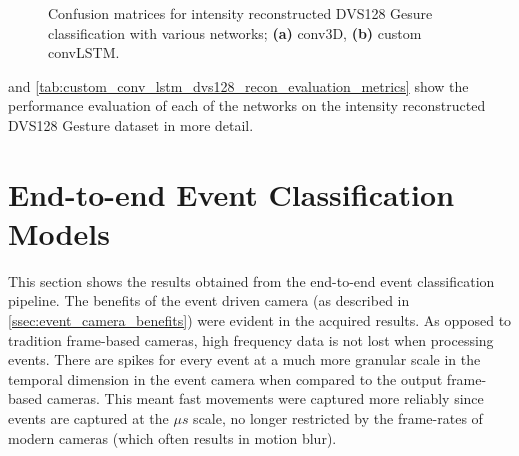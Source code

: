 \begin{figure}[htb]%
    \centering
    \qquad
    \caption{Confusion matrices for intensity reconstructed  DVS128 Gesure classification with various networks; \textbf{(a)} conv3D, \textbf{(b)} custom convLSTM.}%
    \label{fig:dvs128_recon_c_matrices}%
\end{figure}

 and \cref{tab:custom_conv_lstm_dvs128_recon_evaluation_metrics} show the performance evaluation of each of the networks on the intensity reconstructed DVS128 Gesture dataset in more detail. 

\section{End-to-end Event Classification Models}

This section shows the results obtained from the end-to-end event classification pipeline. The benefits of the event driven camera (as described in \cref{ssec:event_camera_benefits}) were evident in the acquired results. As opposed to tradition frame-based cameras, high frequency data is not lost when processing events. There are spikes for every event at a much more granular scale in the temporal dimension in the event camera when compared to the output frame-based cameras. This meant fast movements were captured more reliably since events are captured at the $\mu s$ scale, no longer restricted by the frame-rates of modern cameras (which often results in motion blur).

